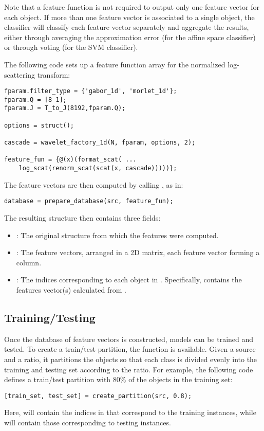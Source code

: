 \documentclass[twocolumn]{article}
\begin{document}
Note that a feature function is not required to output only one feature vector for each object. If more than one feature vector is associated to a single object, the classifier will classify each feature vector separately and aggregate the results, either through averaging the approximation error (for the affine space classifier) or through voting (for the SVM classifier).

The following code sets up a feature function array for the normalized log-scattering transform:
\begin{lstlisting}
fparam.filter_type = {'gabor_1d', 'morlet_1d'};
fparam.Q = [8 1];
fparam.J = T_to_J(8192,fparam.Q);

options = struct();

cascade = wavelet_factory_1d(N, fparam, options, 2);

feature_fun = {@(x)(format_scat( ...
	log_scat(renorm_scat(scat(x, cascade)))))};
\end{lstlisting}

The feature vectors are then computed by calling , as in:
\begin{lstlisting}
database = prepare_database(src, feature_fun);
\end{lstlisting}
The resulting  structure then contains three fields:
\begin{itemize}
	\item {}: The original  structure from which the features were computed.
	\item {}: The feature vectors, arranged in a 2D matrix, each feature vector forming a column.
	\item {}: The indices corresponding to each object in . Specifically,  contains the features vector(s) calculated from .
\end{itemize}

\subsection{Training/Testing}

Once the database of feature vectors is constructed, models can be trained and tested. To create a train/test partition, the function  is available. Given a source  and a ratio, it partitions the objects so that each class is divided evenly into the training and testing set according to the ratio. For example, the following code defines a train/test partition with $80\%$ of the objects in the training set:
\begin{lstlisting}
[train_set, test_set] = create_partition(src, 0.8);
\end{lstlisting}
Here,  will contain the indices in  that correspond to the training instances, while  will contain those corresponding to testing instances.
\end{document}
